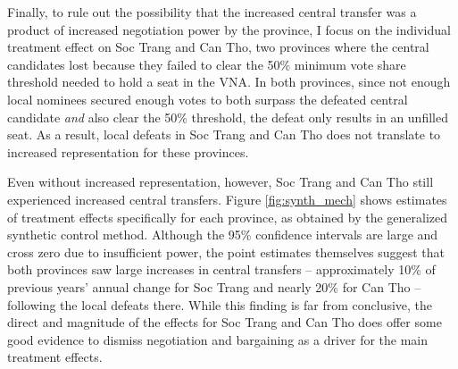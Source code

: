 \documentclass[12pt]{article}
\newcommand{\1}{\mathbbm{1}}
\begin{document}
Finally, to rule out the possibility that the increased central transfer was a product of increased negotiation power by the province, I focus on the individual treatment effect on Soc Trang and Can Tho, two provinces where the central candidates lost because they failed to clear the 50\% minimum vote share threshold needed to hold a seat in the VNA. In both provinces, since not enough local nominees secured enough votes to both surpass the defeated central candidate \textit{and} also clear the 50\% threshold, the defeat only results in an unfilled seat. As a result, local defeats in Soc Trang and Can Tho does not translate to increased representation for these provinces.

Even without increased representation, however, Soc Trang and Can Tho still experienced increased central transfers. Figure \ref{fig:synth_mech} shows estimates of treatment effects specifically for each province, as obtained by the generalized synthetic control method. Although the 95\% confidence intervals are large and cross zero due to insufficient power, the point estimates themselves suggest that both provinces saw large increases in central transfers -- approximately 10\% of previous years' annual change for Soc Trang and nearly 20\% for Can Tho -- following the local defeats there. While this finding is far from conclusive, the direct and magnitude of the effects for Soc Trang and Can Tho does offer some good evidence to dismiss negotiation and bargaining as a driver for the main treatment effects.
\end{document}
